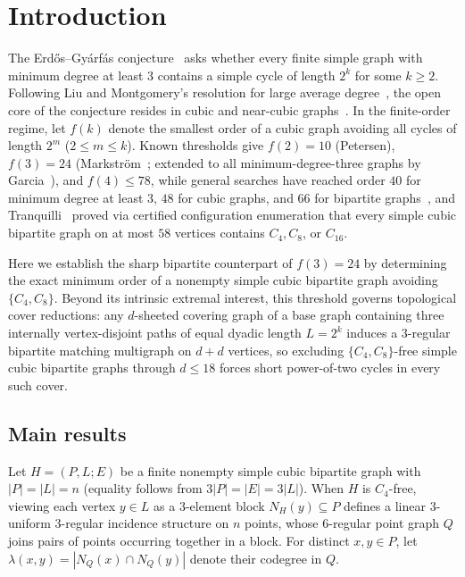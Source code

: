 \documentclass[11pt]{amsart}
\theoremstyle{definition}
\theoremstyle{remark}
\begin{document}
\section{Introduction}

The Erd\H{o}s--Gy\'arf\'as conjecture~\cite{Erdos1997} asks whether every finite simple graph with minimum degree at least $3$ contains a simple cycle of length $2^k$ for some $k \ge 2$. Following Liu and Montgomery's resolution for large average degree~\cite{LiuMontgomery2023}, the open core of the conjecture resides in cubic and near-cubic graphs~\cite{Carr2026}. In the finite-order regime, let $f(k)$ denote the smallest order of a cubic graph avoiding all cycles of length $2^m$ ($2 \le m \le k$). Known thresholds give $f(2) = 10$ (Petersen), $f(3) = 24$ (Markstr\"om~\cite{Markstrom2004}; extended to all minimum-degree-three graphs by Garcia~\cite{Garcia2026}), and $f(4) \le 78$, while general searches have reached order $40$ for minimum degree at least $3$, $48$ for cubic graphs, and $66$ for bipartite graphs~\cite{DucoffeDumitru2026}, and Tranquilli~\cite{Tranquilli2026} proved via certified configuration enumeration that every simple cubic bipartite graph on at most $58$ vertices contains $C_4, C_8$, or $C_{16}$.

Here we establish the sharp bipartite counterpart of $f(3) = 24$ by determining the exact minimum order of a nonempty simple cubic bipartite graph avoiding $\{C_4, C_8\}$. Beyond its intrinsic extremal interest, this threshold governs topological cover reductions: any $d$-sheeted covering graph of a base graph containing three internally vertex-disjoint paths of equal dyadic length $L = 2^k$ induces a $3$-regular bipartite matching multigraph on $d+d$ vertices, so excluding $\{C_4, C_8\}$-free simple cubic bipartite graphs through $d \le 18$ forces short power-of-two cycles in every such cover.

\subsection{Main results}

Let $H = (P, L; E)$ be a finite nonempty simple cubic bipartite graph with $|P| = |L| = n$ (equality follows from $3|P| = |E| = 3|L|$). When $H$ is $C_4$-free, viewing each vertex $y \in L$ as a $3$-element block $N_H(y) \subseteq P$ defines a linear $3$-uniform $3$-regular incidence structure on $n$ points, whose $6$-regular point graph $Q$ joins pairs of points occurring together in a block. For distinct $x, y \in P$, let $\lambda(x,y) = |N_Q(x) \cap N_Q(y)|$ denote their codegree in $Q$.
\end{document}
